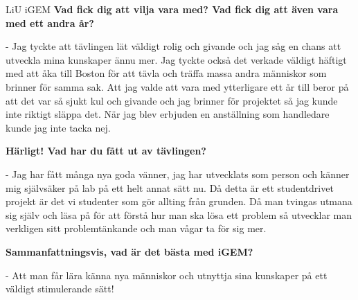 \begin{news}{3}{LiU iGEM}{}{}{}{}
  \textbf{Vad fick dig att vilja vara med? Vad fick dig att även vara
    med ett andra år?}
  
  - Jag tyckte att tävlingen lät väldigt rolig och
  givande och jag såg en chans att utveckla mina kunskaper ännu
  mer. Jag tyckte också det verkade väldigt häftigt med att åka till
  Boston för att tävla och träffa massa andra människor som brinner
  för samma sak. Att jag valde att vara med ytterligare ett år till
  beror på att det var så sjukt kul och givande och jag brinner för
  projektet så jag kunde inte riktigt släppa det. När jag blev
  erbjuden en anställning som handledare kunde jag inte tacka nej.

  \textbf{Härligt! Vad har du fått ut av tävlingen?}
  
  - Jag har fått många
  nya goda vänner, jag har utvecklats som person och känner mig
  självsäker på lab på ett helt annat sätt nu. Då detta är ett
  studentdrivet projekt är det vi studenter som gör allting från
  grunden. Då man tvingas utmana sig själv och läsa på för att förstå
  hur man ska lösa ett problem så utvecklar man verkligen sitt
  problemtänkande och man vågar ta för sig mer.

  \textbf{Sammanfattningsvis, vad är det bästa med iGEM?}
  
  - Att man får
  lära känna nya människor och utnyttja sina kunskaper på ett väldigt
  stimulerande sätt!

\end{news}


%
%
%
%

